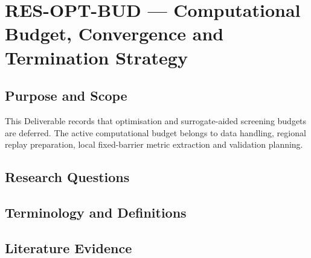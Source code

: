 
\section{RES-OPT-BUD --- Computational Budget, Convergence and Termination Strategy}
\label{sec:res-opt-bud}

\subsection{Purpose and Scope}
\label{sec:res-opt-bud-purpose}

This Deliverable records that optimisation and surrogate-aided
screening budgets are deferred. The active computational budget belongs
to data handling, regional replay preparation, local fixed-barrier
metric extraction and validation planning.

\subsection{Research Questions}
\label{sec:res-opt-bud-research-questions}


\subsection{Terminology and Definitions}
\label{sec:res-opt-bud-definitions}


\subsection{Literature Evidence}
\label{sec:res-opt-bud-literature-evidence}

%

